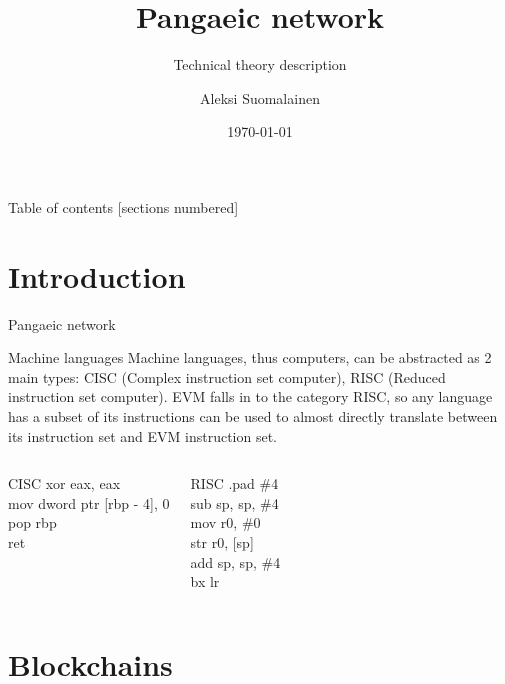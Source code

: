 \documentclass[10pt]{beamer}
\title{Pangaeic network}
\subtitle{Technical theory description}
\date{\today}
\author{Aleksi Suomalainen}
\begin{document}
\maketitle

\begin{frame}{Table of contents}
  [sections numbered]
  \tableofcontents[hideallsubsections]
\end{frame}

\section{Introduction}

\begin{frame}{Pangaeic network}

\end{frame}

\begin{frame}{Machine languages}
Machine languages, thus computers, can be abstracted as 2 main types: CISC (Complex instruction set computer), RISC (Reduced instruction set computer). EVM falls in to the category RISC, so any language has a subset of its instructions can be used to almost directly translate between its instruction set and EVM instruction set.
\begin{columns}[T,onlytextwidth]
      \begin{alertblock}{CISC}
         xor     eax, eax\\
        mov     dword ptr [rbp - 4], 0\\
        pop     rbp\\
        ret
      \end{alertblock}
	\begin{exampleblock}{RISC}
         .pad    \#4\\
        sub     sp, sp, \#4\\
        mov     r0, \#0\\
        str     r0, [sp]\\
        add     sp, sp, \#4\\
        bx      lr
      	\end{exampleblock}
\end{columns}
\end{frame}


\section{Blockchains}
\end{document}
